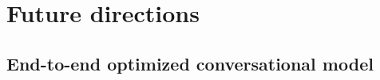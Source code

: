 \documentclass[10pt, compress,british,xcolor={svgnames,dvipsnames,x11names},trans]{beamer}
\begin{document}

\section{Future directions}  %


\subsection{End-to-end optimized conversational model}  %
\end{document}
